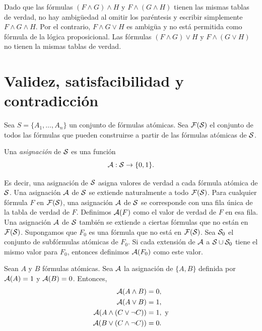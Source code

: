 \message{ !name(main.tex)}\documentclass[12pt,a4paper]{book}
\begin{document}
    Dado que las fórmulas $(F\wedge G)\wedge H$ y $F\wedge(G\wedge H)$ tienen las mismas tablas de verdad, no hay ambigüedad al omitir los paréntesis y escribir
    simplemente $F\wedge G\wedge H$. Por el contrario, $F\wedge G\vee H$ es ambigüa y no está permitida como fórmula de la lógica proposicional. Las
    fórmulas $(F\wedge G)\vee H$ y $F\wedge(G\vee H)$ no tienen la mismas tablas de verdad.

    \section{Validez, satisfacibilidad y contradicción}

    Sea $S=\{A_{1},\dots,A_{n}\}$ un conjunto de fórmulas atómicas. Sea $\FF(\SS)$ el conjunto de todos las fórmulas que
    pueden construirse a partir de las fórmulas atómicas de $\SS$.

    \begin{definicion}[Asignación]
        Una \textit{asignación} de $\SS$ es una función
        \begin{equation*}
            \AA:\SS\to\{0,1\}.
        \end{equation*}
    \end{definicion}

    Es decir, una asignación de $\SS$ asigna valores de verdad a cada fórmula atómica de $\SS$. Una asignación $\AA$ de $\SS$ se extiende naturalmente a todo
    $\FF(\SS)$. Para cualquier fórmula $F$ en $\FF(\SS)$, una asignación $\AA$ de $\SS$ se corresponde con una fila única de la tabla de verdad de $F$.
    Definimos $\AA(F)$ como el valor de verdad de $F$ en esa fila. Una asignación $\AA$ de $\SS$ también se extiende a ciertas fórmulas que no están en $\FF(\SS)$.
    Supongamos que $F_{0}$ es una fórmula que no está en $\FF(\SS)$. Sea $\SS_{0}$ el conjunto de subfórmulas atómicas de $F_{0}$. Si cada extensión de $\AA$
    a $\SS\cup\SS_{0}$ tiene el mismo valor para $F_{0}$, entonces definimos $\AA(F_{0})$ como este valor.

    \begin{ejemplo}
        Sean $A$ y $B$ fórmulas atómicas. Sea $\AA$ la asignación de $\{A,B\}$ definida por $\AA(A)=1$ y $\AA(B)=0$. Entonces,
        \begin{align*}
            \AA(A\wedge B)&=0,\\
            \AA(A\vee B)&=1,\\
            \AA(A\wedge(C\vee\neg C))&=1,\text{ y}\\
            \AA(B\vee(C\wedge\neg C))&=0.
        \end{align*}
    \end{ejemplo}
\end{document}
